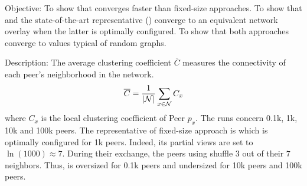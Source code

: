 \begin{asparadesc}
\item[Objective:] To show that \SPRAY converges faster than fixed-size
  approaches. To show that \SPRAY and the state-of-the-art representative
  (\CYCLON) converge to an equivalent network overlay when the latter is
  optimally configured. To show that both approaches converge to values typical
  of random graphs.
\item[Description:] The average clustering coefficient $\overline{C}$ measures
  the connectivity of each peer's neighborhood in the network.
  \begin{equation}
    \overline{C} = {1\over |\mathcal{N}|}\sum\limits_{x\in\mathcal{N}}C_x
  \end{equation}
  where $C_x$ is the local clustering coefficient of Peer $p_x$.  The runs
  concern 0.1k, 1k, 10k and 100k peers. The representative of fixed-size
  approach is \CYCLON which is optimally configured for 1k peers. Indeed, its
  partial views are set to $\ln(1000)\approx 7$. During their exchange, the
  peers using \CYCLON shuffle $3$ out of their $7$ neighbors. Thus, \CYCLON
  is oversized for 0.1k peers and undersized for 10k peers and 100k peers.



\end{asparadesc}
